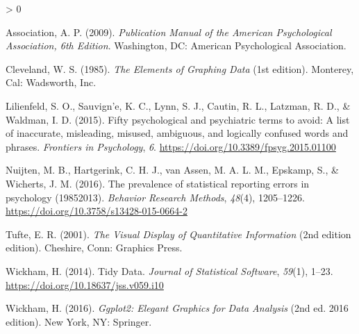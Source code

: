\documentclass[
]{article}
\newlength{\cslhangindent}
\newenvironment{CSLReferences}[2] %
 {%
  \setlength{\parindent}{0pt}
  \ifodd #1 \everypar{\setlength{\hangindent}{\cslhangindent}}\ignorespaces\fi
  \ifnum #2 > 0
  \setlength{\parskip}{#2\baselineskip}
  \fi
 }%
 {}
\begin{document}
\hypertarget{refs}{}
\begin{CSLReferences}{1}{0}
\leavevmode\hypertarget{ref-associationPublicationManualAmerican2009}{}%
Association, A. P. (2009). \emph{Publication {Manual} of the {American Psychological Association}, 6th {Edition}}. {Washington, DC}: {American Psychological Association}.

\leavevmode\hypertarget{ref-clevelandElementsGraphingData1985}{}%
Cleveland, W. S. (1985). \emph{The {Elements} of {Graphing Data}} (1st edition). {Monterey, Cal}: {Wadsworth, Inc.}

\leavevmode\hypertarget{ref-lilienfeldFiftyPsychologicalPsychiatric2015}{}%
Lilienfeld, S. O., Sauvign'e, K. C., Lynn, S. J., Cautin, R. L., Latzman, R. D., \& Waldman, I. D. (2015). Fifty psychological and psychiatric terms to avoid: A list of inaccurate, misleading, misused, ambiguous, and logically confused words and phrases. \emph{Frontiers in Psychology}, \emph{6}. \url{https://doi.org/10.3389/fpsyg.2015.01100}

\leavevmode\hypertarget{ref-nuijtenPrevalenceStatisticalReporting2016}{}%
Nuijten, M. B., Hartgerink, C. H. J., van Assen, M. A. L. M., Epskamp, S., \& Wicherts, J. M. (2016). The prevalence of statistical reporting errors in psychology (1985{}2013). \emph{Behavior Research Methods}, \emph{48}(4), 1205--1226. \url{https://doi.org/10.3758/s13428-015-0664-2}

\leavevmode\hypertarget{ref-tufteVisualDisplayQuantitative2001}{}%
Tufte, E. R. (2001). \emph{The {Visual Display} of {Quantitative Information}} (2nd edition edition). {Cheshire, Conn}: {Graphics Press}.

\leavevmode\hypertarget{ref-wickhamTidyData2014}{}%
Wickham, H. (2014). Tidy {Data}. \emph{Journal of Statistical Software}, \emph{59}(1), 1--23. \url{https://doi.org/10.18637/jss.v059.i10}

\leavevmode\hypertarget{ref-wickhamGgplot2ElegantGraphics2016}{}%
Wickham, H. (2016). \emph{Ggplot2: {Elegant Graphics} for {Data Analysis}} (2nd ed. 2016 edition). {New York, NY}: {Springer}.

\end{CSLReferences}
\end{document}
